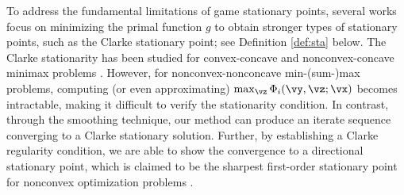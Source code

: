 	To address the fundamental limitations of game stationary points, several works focus on minimizing the primal function $g$ to obtain %
	stronger types of stationary points, such as the Clarke stationary point; see Definition \ref{def:sta} below. %
	The Clarke stationarity  
	has been %
	studied for convex-concave and nonconvex-concave minimax problems \cite{lin2020gradient,rahimian2019distributionally,lu2020hybrid,thekumparampil2019efficient}. However, for nonconvex-nonconcave min-(sum-)max problems, computing (or even approximating) $\max_{\vz}\Phi_i(\vy,\vz;\vx)$ becomes intractable, making it difficult to verify the stationarity condition. In contrast, through the smoothing technique, our method can produce an iterate sequence converging to a Clarke stationary solution. Further, by establishing a Clarke regularity condition, we are able to show the convergence to a directional stationary point, which is claimed to be the sharpest first-order stationary point for nonconvex optimization problems \cite{pang2017computing, cui2018composite, cui2021modern}.
	

